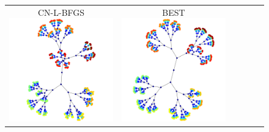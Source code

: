 \documentclass[dvipdfmx,10pt,journal,compsoc]{IEEEtran}
\begin{document}
\begin{figure}[btp]
\begin{tabular}{cccccc}
    \makecell{\small{\textsf{CN-L-BFGS}}                                                                                                                 \\[-0.2em]\includegraphics[width=0.27\columnwidth]{individual/vis/btree9_CN-L-BFGS.png}} &
    \makecell{\small{\textsf{BEST}}                                                                                                                      \\[-0.2em]\includegraphics[width=0.27\columnwidth]{individual/vis/opt_btree9.png}} \\


\end{tabular}
\end{figure}
\end{document}
